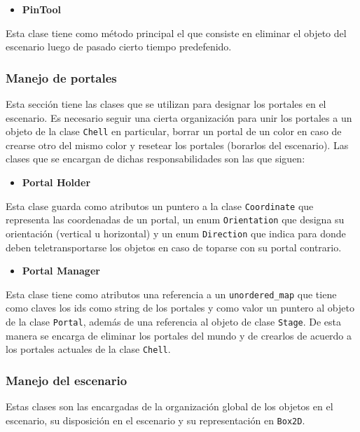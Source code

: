 \documentclass[a4paper]{article}
\begin{document}
\begin{itemize}
	\item \textbf{PinTool}
\end{itemize}

Esta clase tiene como método principal el que consiste en eliminar el objeto del escenario luego de pasado cierto tiempo predefenido.

\subsubsection{Manejo de portales}

Esta sección tiene las clases que se utilizan para designar los portales en el escenario. Es necesario seguir una cierta organización para unir los portales a un objeto de la clase \texttt{Chell} en particular, borrar un portal de un color en caso de crearse otro del mismo color y resetear los portales (borarlos del escenario). Las clases que se encargan de dichas responsabilidades son las que siguen:

\begin{itemize}
	\item \textbf{Portal Holder}
\end{itemize}

Esta clase guarda como atributos un puntero a la clase \texttt{Coordinate} que representa las coordenadas de un portal, un enum \texttt{Orientation} que designa su orientación (vertical u horizontal) y un enum \texttt{Direction} que indica para donde deben teletransportarse los objetos en caso de toparse con su portal contrario.

\begin{itemize}
	\item \textbf{Portal Manager}
\end{itemize}

Esta clase tiene como atributos una referencia a un \texttt{unordered\_map} que tiene como claves los ids como string de los portales y como valor un puntero al objeto de la clase \texttt{Portal}, además de una referencia al objeto de clase \texttt{Stage}. De esta manera se encarga de eliminar los portales del mundo y de crearlos de acuerdo a los portales actuales de la clase \texttt{Chell}.

\subsubsection{Manejo del escenario}

Estas clases son las encargadas de la organización global de los objetos en el escenario, su disposición en el escenario y su representación en \texttt{Box2D}.
\end{document}
